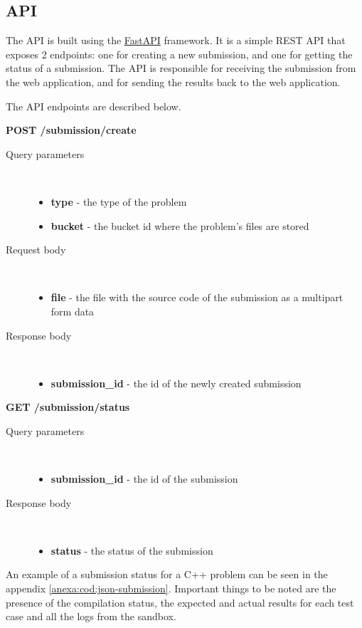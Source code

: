 \documentclass[12pt,a4paper]{report}
\begin{document}
\subsection{API}
The API is built using the \href{https://fastapi.tiangolo.com/}{FastAPI} framework. It is a simple REST API that exposes 2 endpoints: one for creating a new submission, and one for getting the status of a submission. The API is responsible for receiving the submission from the web application, and for sending the results back to the web application.

The API endpoints are described below.

\textbf{POST /submission/create}
\begin{description}
	\item[Query parameters]\
		\begin{itemize}
			\item \textbf{type} - the type of the problem
			\item \textbf{bucket} - the bucket id where the problem's files are stored
		\end{itemize}
	\item[Request body]\
		\begin{itemize}
			\item \textbf{file} - the file with the source code of the submission as a multipart form data
		\end{itemize}
	\item[Response body]\
		\begin{itemize}
			\item \textbf{submission\_id} - the id of the newly created submission
		\end{itemize}
\end{description}

\newpage
\textbf{GET /submission/status}
\begin{description}
	\item[Query parameters]\
		\begin{itemize}
			\item \textbf{submission\_id} - the id of the submission
		\end{itemize}
	\item[Response body]\
		\begin{itemize}
			\item \textbf{status} - the status of the submission
		\end{itemize}
\end{description}

An example of a submission status for a C++ problem can be seen in the appendix \ref{anexa:cod:json-submission}. Important things to be noted are the presence of the compilation status, the expected and actual results for each test case and all the logs from the sandbox.
\end{document}
